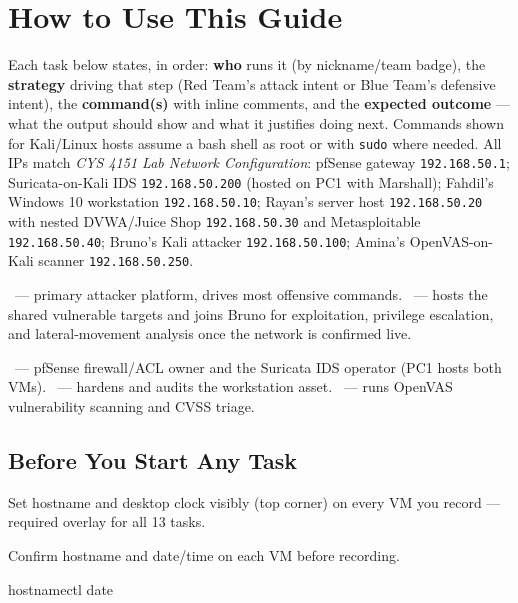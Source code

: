 \documentclass[11pt,a4paper]{article}
\begin{document}
\section{How to Use This Guide}

Each task below states, in order: \textbf{who} runs it (by nickname/team badge), the
\textbf{strategy} driving that step (Red Team's attack intent or Blue Team's defensive
intent), the \textbf{command(s)} with inline comments, and the \textbf{expected
outcome} --- what the output should show and what it justifies doing next. Commands
shown for Kali/Linux hosts assume a bash shell as root or with \texttt{sudo} where
needed. All IPs match \emph{CYS 4151 Lab Network Configuration}: pfSense gateway
\texttt{192.168.50.1}; Suricata-on-Kali IDS \texttt{192.168.50.200} (hosted on PC1 with
Marshall); Fahdil's Windows 10 workstation \texttt{192.168.50.10}; Rayan's server host
\texttt{192.168.50.20} with nested DVWA/Juice Shop \texttt{192.168.50.30} and
Metasploitable \texttt{192.168.50.40}; Bruno's Kali attacker \texttt{192.168.50.100};
Amina's OpenVAS-on-Kali scanner \texttt{192.168.50.250}.

\begin{redbox}
\bruno\ --- primary attacker platform, drives most offensive commands.
\rayan\ --- hosts the shared vulnerable targets and joins Bruno for exploitation,
privilege escalation, and lateral-movement analysis once the network is confirmed live.
\end{redbox}

\begin{bluebox}
\marshall\ --- pfSense firewall/ACL owner and the Suricata IDS operator (PC1 hosts
both VMs). \fahdil\ --- hardens and audits the workstation asset. \amina\ --- runs
OpenVAS vulnerability scanning and CVSS triage.
\end{bluebox}

\subsection{Before You Start Any Task}
\begin{steps}
\item Set hostname and desktop clock visibly (top corner) on every VM you record ---
  required overlay for all 13 tasks.
\item Confirm hostname and date/time on each VM before recording.
\end{steps}

\begin{cmdbox}
\begin{cmdverb}
hostnamectl
date
\end{cmdverb}
\end{cmdbox}
\end{document}
